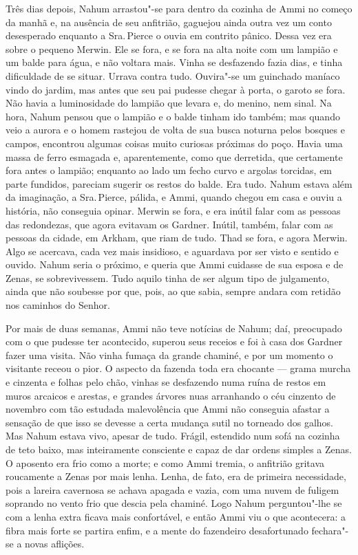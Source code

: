Três dias depois, Nahum arrastou"-se para dentro da cozinha de Ammi no
começo da manhã e, na ausência de seu anfitrião, gaguejou ainda outra
vez um conto desesperado enquanto a Sra.\,Pierce o ouvia em contrito
pânico. Dessa vez era sobre o pequeno Merwin. Ele se fora, e se fora na
alta noite com um lampião e um balde para água, e não voltara mais.
Vinha se desfazendo fazia dias, e tinha dificuldade de se situar. Urrava
contra tudo. Ouvira"-se um guinchado maníaco vindo do jardim, mas antes
que seu pai pudesse chegar à porta, o garoto se fora. Não havia a
luminosidade do lampião que levara e, do menino, nem sinal. Na hora,
Nahum pensou que o lampião e o balde tinham ido também; mas quando veio
a aurora e o homem rastejou de volta de sua busca noturna pelos bosques
e campos, encontrou algumas coisas muito curiosas próximas do poço.
Havia uma massa de ferro esmagada e, aparentemente, como que derretida,
que certamente fora antes o lampião; enquanto ao lado um fecho curvo e
argolas torcidas, em parte fundidos, pareciam sugerir os restos do
balde. Era tudo. Nahum estava além da imaginação, a Sra.\,Pierce, pálida,
e Ammi, quando chegou em casa e ouviu a história, não conseguia opinar.
Merwin se fora, e era inútil falar com as pessoas das redondezas, que
agora evitavam os Gardner. Inútil, também, falar com as pessoas da
cidade, em Arkham, que riam de tudo. Thad se fora, e agora Merwin. Algo
se acercava, cada vez mais insidioso, e aguardava por ser visto e
sentido e ouvido. Nahum seria o próximo, e queria que Ammi cuidasse de
sua esposa e de Zenas, se sobrevivessem. Tudo aquilo tinha de ser algum
tipo de julgamento, ainda que não soubesse por que, pois, ao que sabia,
sempre andara com retidão nos caminhos do Senhor.

Por mais de duas semanas, Ammi não teve notícias de Nahum; daí,
preocupado com o que pudesse ter acontecido, superou seus receios e foi
à casa dos Gardner fazer uma visita. Não vinha fumaça da grande chaminé,
e por um momento o visitante receou o pior. O aspecto da fazenda toda
era chocante --- grama murcha e cinzenta e folhas pelo chão, vinhas se
desfazendo numa ruína de restos em muros arcaicos e arestas, e grandes
árvores nuas arranhando o céu cinzento de novembro com tão estudada
malevolência que Ammi não conseguia afastar a sensação de que isso se
devesse a certa mudança sutil no torneado dos galhos. Mas Nahum estava
vivo, apesar de tudo. Frágil, estendido num sofá na cozinha de teto
baixo, mas inteiramente consciente e capaz de dar ordens simples a
Zenas. O aposento era frio como a morte; e como Ammi tremia, o anfitrião
gritava roucamente a Zenas por mais lenha. Lenha, de fato, era de
primeira necessidade, pois a lareira cavernosa se achava apagada e
vazia, com uma nuvem de fuligem soprando no vento frio que descia pela
chaminé. Logo Nahum perguntou"-lhe se com a lenha extra ficava mais
confortável, e então Ammi viu o que acontecera: a fibra mais forte se
partira enfim, e a mente do fazendeiro desafortunado fechara"-se a novas
aflições.

